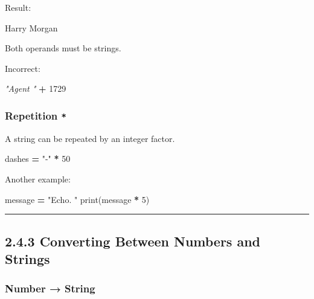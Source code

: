 \documentclass[
]{article}
\newenvironment{Shaded}{\begin{snugshade}}{\end{snugshade}}
\newcommand{\BuiltInTok}[1]{#1}
\newcommand{\CommentTok}[1]{\textcolor[rgb]{0.56,0.35,0.01}{\textit{#1}}}
\newcommand{\DecValTok}[1]{\textcolor[rgb]{0.00,0.00,0.81}{#1}}
\newcommand{\NormalTok}[1]{#1}
\newcommand{\OperatorTok}[1]{\textcolor[rgb]{0.81,0.36,0.00}{\textbf{#1}}}
\newcommand{\StringTok}[1]{\textcolor[rgb]{0.31,0.60,0.02}{#1}}
\begin{document}
Result:

\begin{Shaded}
\begin{Highlighting}[]
\NormalTok{Harry Morgan}
\end{Highlighting}
\end{Shaded}

Both operands must be strings.

Incorrect:

\begin{Shaded}
\begin{Highlighting}[]
\CommentTok{"Agent "} \OperatorTok{+} \DecValTok{1729}
\end{Highlighting}
\end{Shaded}

\subsubsection{\texorpdfstring{Repetition
\texttt{*}}{Repetition *}}\label{repetition}

A string can be repeated by an integer factor.

\begin{Shaded}
\begin{Highlighting}[]
\NormalTok{dashes }\OperatorTok{=} \StringTok{"{-}"} \OperatorTok{*} \DecValTok{50}
\end{Highlighting}
\end{Shaded}

Another example:

\begin{Shaded}
\begin{Highlighting}[]
\NormalTok{message }\OperatorTok{=} \StringTok{"Echo. "}
\BuiltInTok{print}\NormalTok{(message }\OperatorTok{*} \DecValTok{5}\NormalTok{)}
\end{Highlighting}
\end{Shaded}

\begin{center}\rule{0.5\linewidth}{0.5pt}\end{center}

\subsection{2.4.3 Converting Between Numbers and
Strings}\label{converting-between-numbers-and-strings}

\subsubsection{Number → String}\label{number-string}
\end{document}
